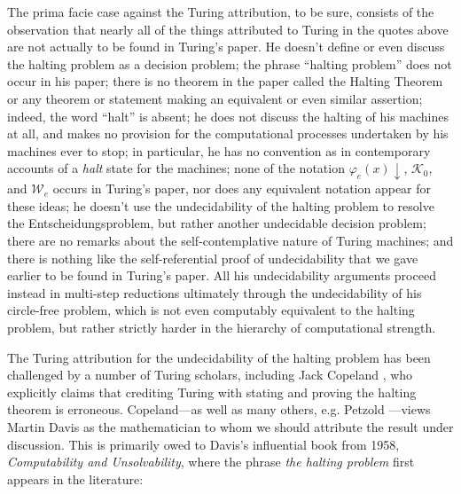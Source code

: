 \documentclass{amsart}
\begin{document}
The prima facie case against the Turing attribution, to be sure, consists of the observation that nearly all of the things attributed to Turing in the quotes above are not actually to be found in Turing's paper. He doesn't define or even discuss the halting problem as a decision problem; the phrase ``halting problem'' does not occur in his paper; there is no theorem in the paper called the Halting Theorem or any theorem or statement making an equivalent or even similar assertion; indeed, the word ``halt'' is absent; he does not discuss the halting of his machines at all, and makes no provision for the computational processes undertaken by his machines ever to stop; in particular, he has no convention as in contemporary accounts of a \emph{halt} state for the machines; none of the notation $\varphi_e(x){\downarrow}$, $\mathcal{K}_0$, and $\mathcal{W}_e$ occurs in Turing's paper, nor does any equivalent notation appear for these ideas; he doesn't use the undecidability of the halting problem to resolve the Entscheidungsproblem, but rather another undecidable decision problem; there are no remarks about the self-contemplative nature of Turing machines; and there is nothing like the self-referential proof of undecidability that we gave earlier to be found in Turing's paper. All his undecidability arguments proceed instead in multi-step reductions ultimately through the undecidability of his circle-free problem, which is not even computably equivalent to the halting problem, but rather strictly harder in the hierarchy of computational strength.

The Turing attribution for the undecidability of the halting problem has been challenged by a number of Turing scholars, including Jack Copeland \cite[p. 40]{copeland2004essential}, who explicitly claims that crediting Turing with stating and proving the halting theorem is erroneous. Copeland---as well as many others, e.g. Petzold \cite[p. 179]{petzold2008annotated}---views Martin Davis as the mathematician to whom we should attribute the result under discussion. This is primarily owed to Davis's influential book from 1958, \textit{Computability and Unsolvability}, where the phrase \textit{the halting problem} first appears in the literature:
\end{document}
